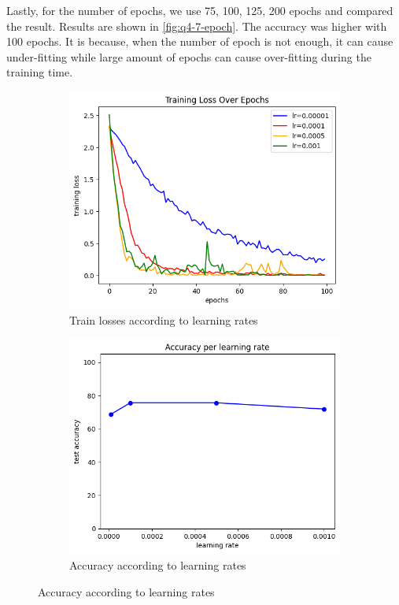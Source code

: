 Lastly, for the number of epochs, we use 75, 100, 125, 200 epochs and compared the result. Results are shown in \cref{fig:q4-7-epoch}. The accuracy was higher with 100 epochs. It is because, when the number of epoch is not enough, it can cause under-fitting while large amount of epochs can cause over-fitting during the training time.

\begin{figure}[htbp]
	\centering
	\begin{subfigure}{0.48\linewidth}
		\centering
		\includegraphics[width=\linewidth]{image/q4-7-lr-train.png}
		\caption{Train losses according to learning rates}
		\label{fig:q4-7-lr-train}
	\end{subfigure}%
	\hfill
	\begin{subfigure}{0.48\linewidth}
		\centering
		\includegraphics[width=\linewidth]{image/q4-7-lr.png}
		\caption{Accuracy according to learning rates}
		\label{fig:q4-7-lr}
	\end{subfigure}
	

\end{figure}
